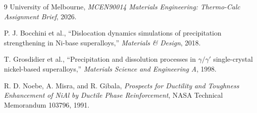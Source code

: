 \documentclass[11pt]{article}
\begin{document}
\FloatBarrier
\begin{thebibliography}{9}
University of Melbourne, \emph{MCEN90014 Materials Engineering: Thermo-Calc Assignment Brief}, 2026.

P. J. Bocchini et al., ``Dislocation dynamics simulations of precipitation strengthening in Ni-base superalloys,'' \emph{Materials \& Design}, 2018.

T. Grosdidier et al., ``Precipitation and dissolution processes in $\gamma/\gamma'$ single-crystal nickel-based superalloys,'' \emph{Materials Science and Engineering A}, 1998.

R. D. Noebe, A. Misra, and R. Gibala, \emph{Prospects for Ductility and Toughness Enhancement of NiAl by Ductile Phase Reinforcement}, NASA Technical Memorandum 103796, 1991.
\end{thebibliography}
\end{document}
